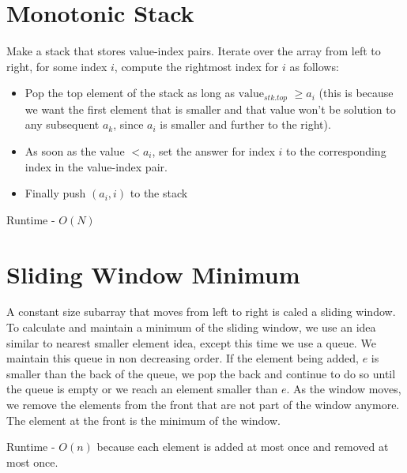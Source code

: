 \documentclass{article}
\begin{document}
	\section{Monotonic Stack}
	\begin{algorithm}[H]
		\SetAlgoLined
		\caption{Nearest smaller element}
	\end{algorithm}
	\vspace{3mm}
	Make a stack that stores value-index pairs. Iterate over the array from left to right, for some index $i$, compute the rightmost index for $i$ as follows:
	\begin{itemize}
		\item Pop the top element of the stack as long as $\text{value}_{stk.top}$ $\geq a_i$ (this is because we want the first element that is smaller and that value won't be solution to any subsequent $a_k$, since $a_i$ is smaller and further to the right).
		\item As soon as the value $< a_i$, set the answer for index $i$ to the corresponding index in the value-index pair.
		\item Finally push $(a_i,i)$ to the stack  
	\end{itemize}
	Runtime - $O(N)$
	\section{Sliding Window Minimum}
	A constant size subarray that moves from left to right is caled a sliding window.  To calculate and maintain a minimum of the sliding window, we use an idea similar to nearest smaller element idea, except this time we use a queue. We maintain this queue in non decreasing order. If the element being added, $e$ is smaller than the back of the queue, we pop the back and continue to do so until the queue is empty or we reach an element smaller than $e$. As the window moves, we remove the elements from the front that are not part of the window anymore. The element at the front is the minimum of the window. \newline
	
	Runtime - $O(n)$ because each element is added at most once and removed at most once.
	
	
\end{document}
